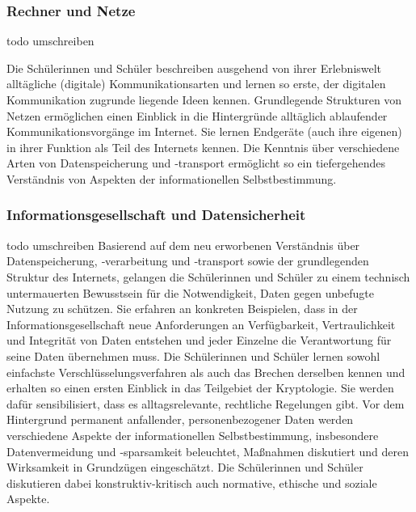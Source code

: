 \subsubsection{Rechner und Netze}
todo umschreiben

Die Schülerinnen und Schüler beschreiben ausgehend von ihrer Erlebniswelt alltägliche (digitale) Kommunikationsarten und lernen so erste, der digitalen Kommunikation zugrunde liegende Ideen kennen. Grundlegende Strukturen von Netzen ermöglichen einen Einblick in die Hintergründe alltäglich ablaufender Kommunikationsvorgänge im Internet. Sie lernen Endgeräte (auch ihre eigenen) in ihrer Funktion als Teil des Internets kennen. Die Kenntnis über verschiedene Arten von Datenspeicherung und ‑transport ermöglicht so ein tiefergehendes Verständnis von Aspekten der informationellen Selbstbestimmung\cite{Rechner}.

\subsubsection{Informationsgesellschaft und Datensicherheit}
todo umschreiben
Basierend auf dem neu erworbenen Verständnis über Datenspeicherung, ‑verarbeitung und ‑transport sowie der grundlegenden Struktur des Internets, gelangen die Schülerinnen und Schüler zu einem technisch untermauerten Bewusstsein für die Notwendigkeit, Daten gegen unbefugte Nutzung zu schützen. Sie erfahren an konkreten Beispielen, dass in der Informationsgesellschaft neue Anforderungen an Verfügbarkeit, Vertraulichkeit und Integrität von Daten entstehen und jeder Einzelne die Verantwortung für seine Daten übernehmen muss.
Die Schülerinnen und Schüler lernen sowohl einfachste Verschlüsselungsverfahren als auch das Brechen derselben kennen und erhalten so einen ersten Einblick in das Teilgebiet der Kryptologie.
Sie werden dafür sensibilisiert, dass es alltagsrelevante, rechtliche Regelungen gibt.
Vor dem Hintergrund permanent anfallender, personenbezogener Daten werden verschiedene Aspekte der informationellen Selbstbestimmung, insbesondere Datenvermeidung und ‑sparsamkeit beleuchtet, Maßnahmen diskutiert und deren Wirksamkeit in Grundzügen eingeschätzt. Die Schülerinnen und Schüler diskutieren dabei konstruktiv-kritisch auch normative, ethische und soziale Aspekte\cite{InfoGes}.

